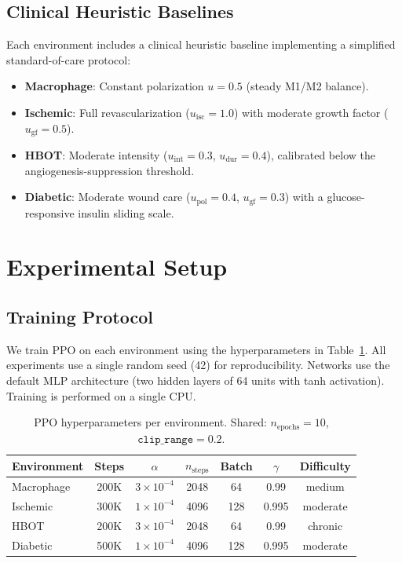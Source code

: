 \documentclass[11pt,a4paper]{article}
\begin{document}
\subsection{Clinical Heuristic Baselines}

Each environment includes a clinical heuristic baseline implementing a simplified standard-of-care protocol:
\begin{itemize}
    \item \textbf{Macrophage}: Constant polarization $u = 0.5$ (steady M1/M2 balance).
    \item \textbf{Ischemic}: Full revascularization ($u_{\text{isc}} = 1.0$) with moderate growth factor ($u_{\text{gf}} = 0.5$).
    \item \textbf{HBOT}: Moderate intensity ($u_{\text{int}} = 0.3$, $u_{\text{dur}} = 0.4$), calibrated below the angiogenesis-suppression threshold.
    \item \textbf{Diabetic}: Moderate wound care ($u_{\text{pol}} = 0.4$, $u_{\text{gf}} = 0.3$) with a glucose-responsive insulin sliding scale.
\end{itemize}

\section{Experimental Setup}

\subsection{Training Protocol}

We train PPO \citep{sb3} on each environment using the hyperparameters in Table~\ref{tab:hyperparams}. All experiments use a single random seed (42) for reproducibility. Networks use the default MLP architecture (two hidden layers of 64 units with tanh activation). Training is performed on a single CPU.

\begin{table}[h]
\centering
\caption{PPO hyperparameters per environment. Shared: $n_{\text{epochs}} = 10$, $\texttt{clip\_range} = 0.2$.}
\label{tab:hyperparams}
\begin{tabular}{@{}lcccccc@{}}
\toprule
Environment & Steps & $\alpha$ & $n_{\text{steps}}$ & Batch & $\gamma$ & Difficulty \\
\midrule
Macrophage & 200K & $3 \times 10^{-4}$ & 2048 & 64 & 0.99 & medium \\
Ischemic & 300K & $1 \times 10^{-4}$ & 4096 & 128 & 0.995 & moderate \\
HBOT & 200K & $3 \times 10^{-4}$ & 2048 & 64 & 0.99 & chronic \\
Diabetic & 500K & $1 \times 10^{-4}$ & 4096 & 128 & 0.995 & moderate \\
\bottomrule
\end{tabular}
\end{table}
\end{document}
